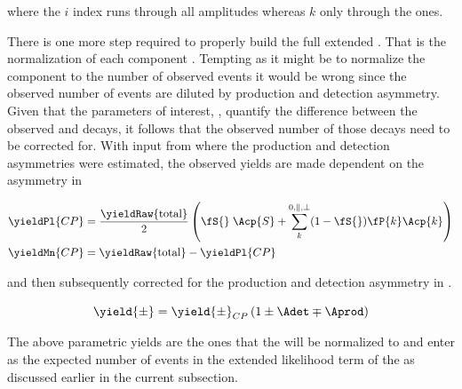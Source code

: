 \noindent where the $i$ index runs through all amplitudes whereas $k$ only through the \pwave ones.

There is one more step required to properly build the full extended \pdf. That is the normalization of each component \pdf. Tempting as it might be to 
normalize the component \pdfs to the number of observed events it would be wrong since the observed number of events are diluted by production and detection
asymmetry. Given that the parameters of interest, \ACP, quantify the difference between the observed \BsbarJpsiKst and \BsJpsiKst decays, it follows that
the observed  number of those decays need to be corrected for. With input from  where the production and detection 
asymmetries were estimated, the observed yields are made dependent on the \ACP asymmetry in  

\begin{align}
\yieldPl{CP} &= \frac{ \yieldRaw{\text{total}} }{2} \left( \fS{}\; \Acp{S} + \sum_k^{0,\parallel,\perp} (1-\fS{})\fP{k}\Acp{k}  \right) \nonumber \\
\yieldMn{CP} &=  \yieldRaw{\text{total}} - \yieldPl{CP} 
\label{acp_yields}
\end{align}

\noindent and then subsequently corrected for the production and detection asymmetry in . 

\begin{equation}
\yield{\pm} = \yield{\pm}_{CP}  \left( 1 \pm \Adet \mp \Aprod \right)
\label{norm_yields}
\end{equation}

\noindent The above parametric yields are the ones that the \pdfs will be normalized to and enter as the expected number of events in the extended
likelihood term of the \pdfs as discussed earlier in the current subsection. 
